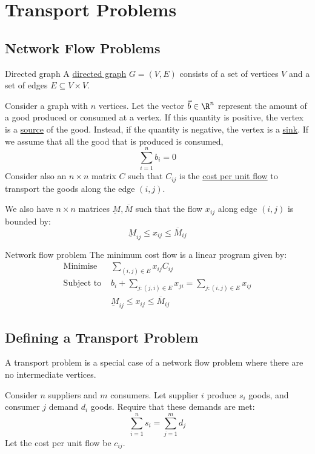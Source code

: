\documentclass[../Main.tex]{subfiles}
\begin{document}
\section{Transport Problems}
\subsection{Network Flow Problems}
\begin{definition}{Directed graph}
    A \underline{directed graph} $G = (V, E)$ consists of a set of vertices $V$ and a set of edges $E \subseteq V \times V$.
\end{definition}
Consider a graph with $n$ vertices. Let the vector $\vec{b} \in \R^n$ represent the amount of a good produced or consumed at a vertex. If this quantity is positive, the vertex is a \underline{source} of the good. Instead, if the quantity is negative, the vertex is a \underline{sink}. If we assume that all the good that is produced is consumed,
\begin{equation*}
    \sum_{i = 1}^n b_i = 0
\end{equation*}
Consider also an $n \times n$ matrix $C$ such that $C_{ij}$ is the \underline{cost per unit flow} to transport the goods along the edge $(i, j)$.

We also have $n \times n$ matrices $\underbar{M}, \overline{M}$ such that the flow $x_{ij}$ along edge $(i, j)$ is bounded by:
\begin{equation*}
    \underbar{M}_{ij} \leq x_{ij} \leq \overline{M}_{ij}
\end{equation*}
\begin{definition}{Network flow problem}
    The minimum cost flow is a linear program given by:
    \begin{align*}
        \text{Minimise } &\sum_{(i, j) \in E} x_{ij} C_{ij} \\
        \text{Subject to } &b_i + \sum_{j : (j,i) \in E} x_{ji} = \sum_{j : (i, j) \in E} x_{ij} \\
        & \underbar{M}_{ij} \leq x_{ij} \leq \overline{M}_{ij}
    \end{align*}
\end{definition}
\subsection{Defining a Transport Problem}
A transport problem is a special case of a network flow problem where there are no intermediate vertices.

Consider $n$ suppliers and $m$ consumers. Let supplier $i$ produce $s_i$ goods, and consumer $j$ demand $d_i$ goods. Require that these demands are met:
\begin{equation*}
    \sum_{i = 1}^n s_i = \sum_{j = 1}^m d_j
\end{equation*}
Let the cost per unit flow be $c_{ij}$.
\end{document}
